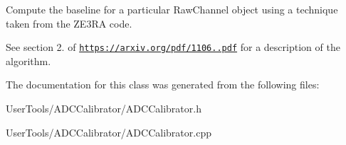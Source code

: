 Compute the baseline for a particular Raw\-Channel object using a technique taken from the Z\-E3\-R\-A code. 

See section 2. of \href{https://arxiv.org/pdf/1106.0808.pdf}{\tt https\-://arxiv.\-org/pdf/1106..\-pdf} for a description of the algorithm. 

The documentation for this class was generated from the following files\-:\begin{DoxyCompactItemize}
\item 
User\-Tools/\-A\-D\-C\-Calibrator/A\-D\-C\-Calibrator.\-h\item 
User\-Tools/\-A\-D\-C\-Calibrator/A\-D\-C\-Calibrator.\-cpp\end{DoxyCompactItemize}
